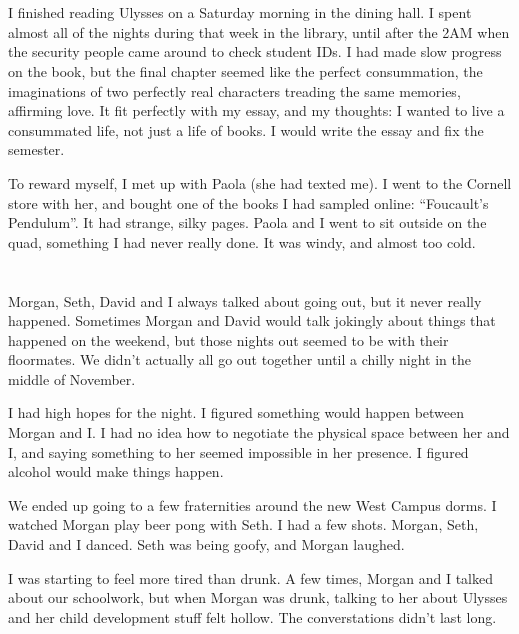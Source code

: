 \section{}

I finished reading Ulysses on a Saturday morning in the dining hall.   I spent
almost all of the nights during that week in the library, until after the 2AM
when the security people came around to check student IDs.  I had made slow
progress on the book, but the final chapter seemed like the perfect
consummation, the imaginations of two perfectly real characters treading the
same memories, affirming love.  It fit perfectly with my essay, and my thoughts:
I wanted to live a consummated life, not just a life of books.  I would write
the essay and fix the semester.

To reward myself, I met up with Paola (she had texted me).  I went to the Cornell
store with her, and bought one of the books I had sampled online: ``Foucault's
Pendulum''.  It had strange, silky pages.  Paola and I went to sit outside on
the quad, something I had never really done.  It was windy, and almost too cold.


\section{}

Morgan, Seth, David and I always talked about going out, but it never really
happened.  Sometimes Morgan and David would talk jokingly about things that
happened on the weekend, but those nights out seemed to be with their
floormates.  We didn't actually all go out together until a chilly night in the
middle of November.  

I had high hopes for the night.  I figured something would happen between Morgan
and I.  I had no idea how to negotiate the physical space between her and I, and
saying something to her seemed impossible in her presence.  I figured alcohol
would make things happen.

We ended up going to a few fraternities around the new West Campus dorms.  I
watched Morgan play beer pong with Seth.  I had a few shots.  Morgan, Seth,
David and I danced.  Seth was being goofy, and Morgan laughed.  

I was starting to feel more tired than drunk.  A few times, Morgan and I talked
about our schoolwork, but when Morgan was drunk, talking to her about Ulysses
and her child development stuff felt hollow.  The converstations didn't last
long.

